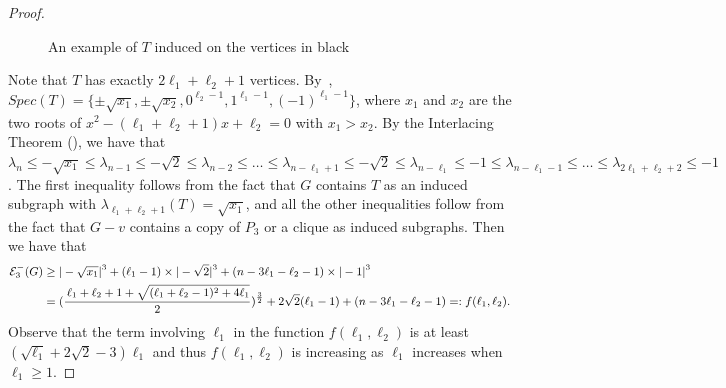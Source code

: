 \documentclass[a4paper,12pt]{article}
\theoremstyle{plain}
\begin{document}
\begin{proof}
\begin{figure}[ht]
\caption{An example of $T$ induced on the vertices in black}
\label{fig:T}
\end{figure}
Note that $T$ has exactly $2\ell_1+\ell_2+1$ vertices. By~, $Spec(T)=\{\pm\sqrt{x_1},\pm\sqrt{x_2},0^{\ell_2-1},1^{\ell_1-1},(-1)^{\ell_1-1}\}$, where $x_1$ and $x_2$ are the two roots of $x^2-(\ell_1+\ell_2+1)x+\ell_2=0$ with $x_1>x_2$. 
By the Interlacing Theorem (), we have that $\lambda_n\leq -\sqrt{x_1}\leq\lambda_{n-1}\leq-\sqrt{2}\leq \lambda_{n-2}\leq\dots\leq\lambda_{n-\ell_1+1}\leq-\sqrt{2}\leq\lambda_{n-\ell_1}\leq-1\leq\lambda_{n-\ell_1-1}\leq \dots\leq \lambda_{2\ell_1+\ell_2+2}\leq -1$. 
The first inequality follows from the fact that $G$ contains $T$ as an induced subgraph with $\lambda_{\ell_1+\ell_2+1}(T)=\sqrt{x_1}$, and all the other inequalities follow from the fact that $G-v$ contains a copy of $P_3$ or a clique as induced subgraphs. Then we have that  $${\small \begin{aligned}\mathcal{E}_3^{-}(G)&\geq |-\sqrt{x_1}|^3+(\ell_1-1)\times|-\sqrt{2}|^3+(n-3\ell_1-\ell_2-1)\times|-1|^3\\
&=
(\frac{\,\ell_1+\ell_2+1+\sqrt{(\ell_1+\ell_2-1)^2+4\ell_1}}{2})^\frac{3}{2}+2\sqrt{2}(\ell_1-1)+(n-3\ell_1-\ell_2-1)=:f(\ell_1, \ell_2).
\end{aligned}}$$
Observe that the term involving $\ell_1$ in the function $f(\ell_1, \ell_2)$ is at least $(\sqrt{\ell_1}+2\sqrt{2}-3)\ell_1$ and thus $f(\ell_1, \ell_2)$ is increasing as $\ell_1$ increases when $\ell_1\geq 1$.


\end{proof}
\end{document}
